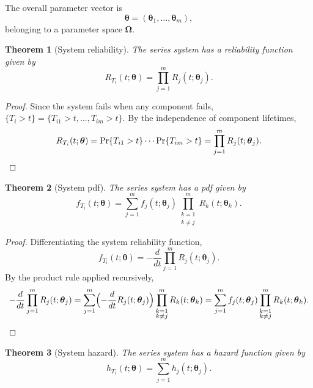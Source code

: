 \documentclass[11pt]{article}
\theoremstyle{definition}
\theoremstyle{plain}
\newtheorem{theorem}{Theorem}
\renewcommand{\v}[1]{\boldsymbol{#1}}
\newcommand{\btheta}{\v{\theta}}
\newcommand{\bomega}{\v{\Omega}}
\begin{document}
The overall parameter vector is
\begin{equation}
    \btheta = (\v{\theta}_1, \ldots, \v{\theta}_m),
\end{equation}
belonging to a parameter space $\bomega$.

\begin{theorem}[System reliability]
\label{thm:sys-reliability}
The series system has a reliability function given by
\begin{equation}
\label{eq:sys-reliability}
    R_{T_i}(t; \btheta) = \prod_{j=1}^m R_j(t; \v{\theta}_j).
\end{equation}
\end{theorem}

\begin{proof}
Since the system fails when any component fails,
$\{T_i > t\} = \{T_{i1} > t, \ldots, T_{im} > t\}$.
By the independence of component lifetimes,
\[
    R_{T_i}(t; \btheta) = \Pr\{T_{i1} > t\} \cdots \Pr\{T_{im} > t\}
    = \prod_{j=1}^m R_j(t; \v{\theta}_j).
    \qedhere
\]
\end{proof}

\begin{theorem}[System pdf]
\label{thm:sys-pdf}
The series system has a pdf given by
\begin{equation}
\label{eq:sys-pdf}
    f_{T_i}(t; \btheta) = \sum_{j=1}^m f_j(t; \v{\theta}_j)
        \prod_{\substack{k=1 \\ k \neq j}}^m R_k(t; \v{\theta}_k).
\end{equation}
\end{theorem}

\begin{proof}
Differentiating the system reliability function,
\[
    f_{T_i}(t; \btheta) = -\frac{d}{dt} \prod_{j=1}^m R_j(t; \v{\theta}_j).
\]
By the product rule applied recursively,
\[
    -\frac{d}{dt} \prod_{j=1}^m R_j(t; \v{\theta}_j)
    = \sum_{j=1}^m \Bigl(-\frac{d}{dt} R_j(t; \v{\theta}_j)\Bigr)
      \prod_{\substack{k=1 \\ k \neq j}}^m R_k(t; \v{\theta}_k)
    = \sum_{j=1}^m f_j(t; \v{\theta}_j)
      \prod_{\substack{k=1 \\ k \neq j}}^m R_k(t; \v{\theta}_k).
    \qedhere
\]
\end{proof}

\begin{theorem}[System hazard]
\label{thm:sys-hazard}
The series system has a hazard function given by
\begin{equation}
\label{eq:sys-hazard}
    h_{T_i}(t; \btheta) = \sum_{j=1}^m h_j(t; \v{\theta}_j).
\end{equation}
\end{theorem}
\end{document}
